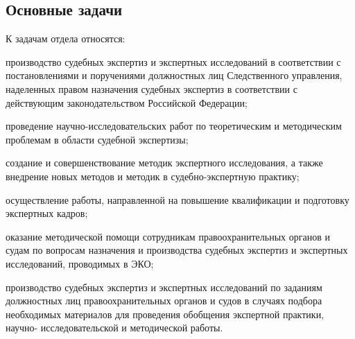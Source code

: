 \subsection{Основные задачи}
К задачам отдела относятся:
\begin{itemize*}
	\item производство судебных экспертиз и экспертных исследований в соответствии с постановлениями и поручениями должностных лиц Следственного управления, наделенных правом назначения судебных экспертиз в соответствии с действующим законодательством Российской Федерации;
	\item проведение научно-исследовательских работ по теоретическим и методическим проблемам в области судебной экспертизы;
	\item создание и совершенствование методик экспертного исследования, а также внедрение новых методов и методик в судебно-экспертную практику;
	\item осуществление работы, направленной на повышение квалификации и подготовку экспертных кадров;
	\item оказание методической помощи сотрудникам правоохранительных органов и судам по вопросам назначения и производства судебных экспертиз и экспертных исследований, проводимых в ЭКО;
	\item производство судебных экспертиз и экспертных исследований по заданиям должностных лиц правоохранительных органов и судов в случаях подбора необходимых материалов для проведения обобщения экспертной практики, научно- исследовательской и методической работы.
\end{itemize*}